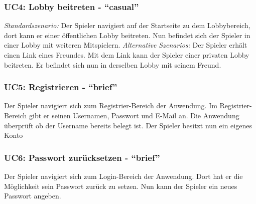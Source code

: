 \documentclass[11pt,ngerman]{article}
\newcommand{\quotes}[1]{``#1''}
\begin{document}
    \subsubsection{UC4: Lobby beitreten - \quotes{casual}}
    \label{sssec:UC4Lobbybeitreten}
    \begin{tcolorbox}[enhanced, breakable, sharp corners, width=\dimexpr\textwidth-15mm\relax ,enlarge left by=10mm ,fontupper=\linespread{1.1}\selectfont, boxrule=1pt, title={UC4: Lobby beitreten }, colback=white, colframe=gray!22, coltitle=black]
    	\textit{Standardszenario:} Der Spieler navigiert auf der Startseite zu dem Lobbybereich, dort kann er einer öffentlichen Lobby beitreten. \newline
    	Nun befindet sich der Spieler in einer Lobby mit weiteren Mitspielern.\newline
    	\newline
    	\textit{Alternative Szenarios:} \newline
    	Der Spieler erhält einen Link eines Freundes. Mit dem Link kann der Spieler einer privaten Lobby beitreten. \newline
    	Er befindet sich nun in derselben Lobby mit seinem Freund.
    \end{tcolorbox}

    \subsubsection{UC5: Registrieren - \quotes{brief}}
    \label{sssec:UC5Registrieren}
    \begin{tcolorbox}[enhanced, breakable, sharp corners, width=\dimexpr\textwidth-15mm\relax ,enlarge left by=10mm ,fontupper=\linespread{1.1}\selectfont, boxrule=1pt, title={UC5: Registrieren}, colback=white, colframe=gray!22, coltitle=black]
    	Der Spieler navigiert sich zum Registrier-Bereich der Anwendung. Im Registrier-Bereich gibt er seinen Usernamen, Passwort und E-Mail an.\newline
    	Die Anwendung überprüft ob der Username bereits belegt ist. Der Spieler besitzt nun ein eigenes Konto
    \end{tcolorbox}

    \subsubsection{UC6: Passwort zurücksetzen - \quotes{brief}}
    \label{sssec:UC6Passwortsetzen}
    \begin{tcolorbox}[enhanced, breakable, sharp corners, width=\dimexpr\textwidth-15mm\relax ,enlarge left by=10mm ,fontupper=\linespread{1.1}\selectfont, boxrule=1pt, title={UC6: Passwort zurücksetzen}, colback=white, colframe=gray!22, coltitle=black]
    	Der Spieler navigiert sich zum Login-Bereich der Anwendung. Dort hat er die Möglichkeit sein Passwort zurück zu setzen.\newline
    	Nun kann der Spieler ein neues Passwort angeben.
    \end{tcolorbox}
\end{document}
